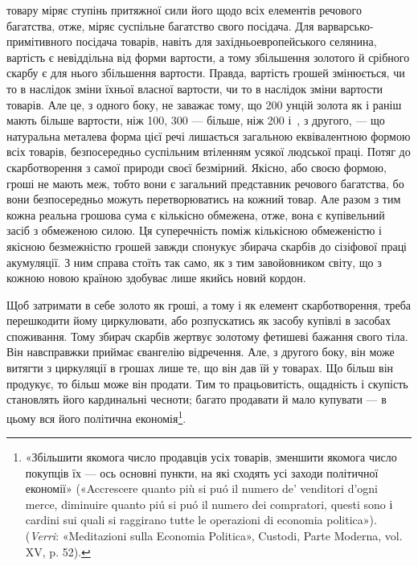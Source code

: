 \parcont{}  %
товару міряє ступінь притяжної сили його щодо всіх елементів
речового багатства, отже, міряє суспільне багатство свого посідача.
Для варварсько-примітивного посідача товарів, навіть
для західньоевропейського селянина, вартість є невіддільна від
форми вартости, а тому збільшення золотого й срібного скарбу
є для нього збільшення вартости. Правда, вартість грошей змінюється,
чи то в наслідок зміни їхньої власної вартости, чи то
в наслідок зміни вартости товарів. Але це, з одного боку, не
заважає тому, що 200 унцій золота як і раніш мають більше
вартости, ніж 100, 300 — більше, ніж 200 і~, з другого, —
що натуральна металева форма цієї речі лишається загальною
еквівалентною формою всіх товарів, безпосередньо суспільним
втіленням усякої людської праці. Потяг до скарботворення з
самої природи своєї безмірний. Якісно, або своєю формою, гроші
не мають меж, тобто вони є загальний представник речового
багатства, бо вони безпосередньо можуть перетворюватись на
кожний товар. Але разом з тим кожна реальна грошова сума є
кількісно обмежена, отже, вона є купівельний засіб з обмеженою
силою. Ця суперечність поміж кількісною обмеженістю і якісною
безмежністю грошей завжди спонукує збирача скарбів до сізіфової
праці акумуляції. З ним справа стоїть так само, як з
тим завойовником світу, що з кожною новою країною здобуває
лише якийсь новий кордон.

Щоб затримати в себе золото як гроші, а тому і як елемент
скарботворення, треба перешкодити йому циркулювати, або розпускатись
як засобу купівлі в засобах споживання. Тому збирач
скарбів жертвує золотому фетишеві бажання свого тіла.
Він навсправжки приймає євангелію відречення. Але, з другого
боку, він може витягти з циркуляції в грошах лише те, що він
дав їй у товарах. Що більш він продукує, то більш може він
продати. Тим то працьовитість, ощадність і скупість становлять
його кардинальні чесноти; багато продавати й мало купувати —
в цьому вся його політична економія\footnote{«Збільшити якомога число продавців усіх товарів, зменшити якомога
число покупців їх — ось основні пункти, на які сходять усі заходи
політичної економії» («Accrescere quanto più si puó il numero de’ venditori
d’ogni merce, diminuire quanto piú si puó il numero dei compratori, questi
sono і cardini sui quali si raggirano tutte le operazioni di economia politica»).
(\emph{Verri}: «Meditazioni sulla Economia Politica», Custodi, Parte Moderna,
vol. XV, p. 52).}.

